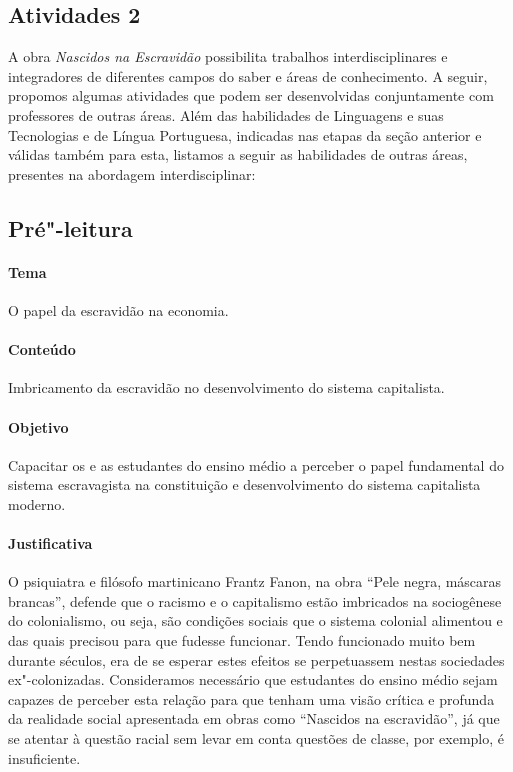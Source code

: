 \documentclass[11pt]{extarticle}
\begin{document}
\begin{enumerate}
\begin{enumerate}
\begin{enumerate}


\section{Atividades 2}

A obra \emph{Nascidos na Escravidão} possibilita trabalhos
interdisciplinares e integradores de diferentes campos do saber e áreas
de conhecimento. A seguir, propomos algumas atividades que podem ser
desenvolvidas conjuntamente com professores de outras áreas. Além das
habilidades de Linguagens e suas Tecnologias e de Língua Portuguesa,
indicadas nas etapas da seção anterior e válidas também para esta,
listamos a seguir as habilidades de outras áreas, presentes na abordagem
interdisciplinar:

\subsection{Pré"-leitura}


\paragraph{Tema} O papel da escravidão na economia.

\paragraph{Conteúdo} Imbricamento da escravidão no desenvolvimento do sistema capitalista.

\paragraph{Objetivo} Capacitar os e as estudantes do ensino médio a perceber o papel fundamental
do sistema escravagista na constituição e desenvolvimento do sistema capitalista moderno.

\paragraph{Justificativa} O psiquiatra e filósofo martinicano Frantz Fanon, na obra ``Pele negra,
máscaras brancas'', defende que o racismo e o capitalismo estão imbricados na sociogênese 
do colonialismo, ou seja, são condições sociais que o sistema colonial alimentou e das 
quais precisou para que fudesse funcionar. Tendo funcionado muito bem durante séculos, 
era de se esperar estes efeitos se perpetuassem nestas sociedades ex"-colonizadas. 
Consideramos necessário que estudantes do ensino médio sejam capazes de perceber 
esta relação para que tenham uma visão crítica e profunda da realidade social
apresentada em obras como ``Nascidos na escravidão'', já que se atentar à questão
racial sem levar em conta questões de classe, por exemplo, é insuficiente. 


\end{enumerate}
\end{enumerate}
\end{enumerate}
\end{document}
